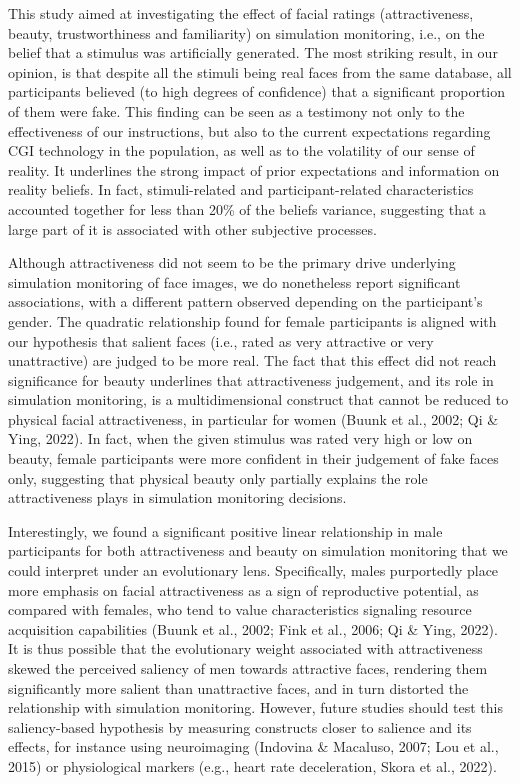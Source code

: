 \documentclass[
  man,floatsintext]{apa6}
\begin{document}
This study aimed at investigating the effect of facial ratings (attractiveness, beauty, trustworthiness and familiarity) on simulation monitoring, i.e., on the belief that a stimulus was artificially generated. The most striking result, in our opinion, is that despite all the stimuli being real faces from the same database, all participants believed (to high degrees of confidence) that a significant proportion of them were fake. This finding can be seen as a testimony not only to the effectiveness of our instructions, but also to the current expectations regarding CGI technology in the population, as well as to the volatility of our sense of reality. It underlines the strong impact of prior expectations and information on reality beliefs. In fact, stimuli-related and participant-related characteristics accounted together for less than 20\% of the beliefs variance, suggesting that a large part of it is associated with other subjective processes.

Although attractiveness did not seem to be the primary drive underlying simulation monitoring of face images, we do nonetheless report significant associations, with a different pattern observed depending on the participant's gender. The quadratic relationship found for female participants is aligned with our hypothesis that salient faces (i.e., rated as very attractive or very unattractive) are judged to be more real. The fact that this effect did not reach significance for beauty underlines that attractiveness judgement, and its role in simulation monitoring, is a multidimensional construct that cannot be reduced to physical facial attractiveness, in particular for women (Buunk et al., 2002; Qi \& Ying, 2022). In fact, when the given stimulus was rated very high or low on beauty, female participants were more confident in their judgement of fake faces only, suggesting that physical beauty only partially explains the role attractiveness plays in simulation monitoring decisions.

Interestingly, we found a significant positive linear relationship in male participants for both attractiveness and beauty on simulation monitoring that we could interpret under an evolutionary lens. Specifically, males purportedly place more emphasis on facial attractiveness as a sign of reproductive potential, as compared with females, who tend to value characteristics signaling resource acquisition capabilities (Buunk et al., 2002; Fink et al., 2006; Qi \& Ying, 2022). It is thus possible that the evolutionary weight associated with attractiveness skewed the perceived saliency of men towards attractive faces, rendering them significantly more salient than unattractive faces, and in turn distorted the relationship with simulation monitoring. However, future studies should test this saliency-based hypothesis by measuring constructs closer to salience and its effects, for instance using neuroimaging (Indovina \& Macaluso, 2007; Lou et al., 2015) or physiological markers (e.g., heart rate deceleration, Skora et al., 2022).
\end{document}
